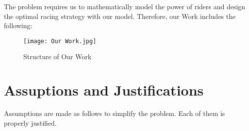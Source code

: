 \documentclass{mcmthesis}
\begin{document}
The problem requires us to mathematically model the power of riders and design the optimal racing strategy with our model. Therefore, our Work includes the following:
\newpage
\begin{figure}[h]
	\centering
	\texttt{[image: Our Work.jpg]}
	\caption{Structure of Our Work} 
\end{figure}






\section{Assuptions and Justifications}

Assumptions are made as follows to simplify the problem. Each of them is properly justified.
\end{document}
